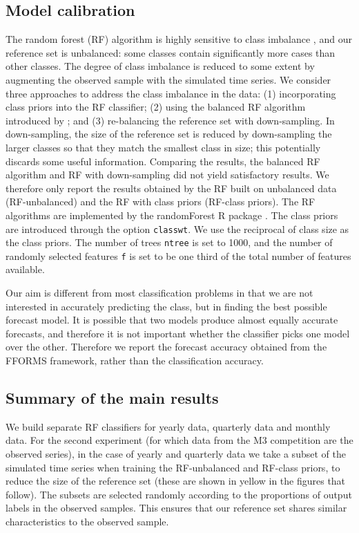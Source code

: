 \documentclass[11pt,a4paper,]{article}
\theoremstyle{definition}
\theoremstyle{definition}
\theoremstyle{definition}
\theoremstyle{remark}
\begin{document}
\hypertarget{model-calibration}{%
\subsection{Model calibration}\label{model-calibration}}

The random forest (RF) algorithm is highly sensitive to class imbalance
\autocite{breiman2001random}, and our reference set is unbalanced: some
classes contain significantly more cases than other classes. The degree
of class imbalance is reduced to some extent by augmenting the observed
sample with the simulated time series. We consider three approaches to
address the class imbalance in the data: (1) incorporating class priors
into the RF classifier; (2) using the balanced RF algorithm introduced
by \textcite{chen2004using}; and (3) re-balancing the reference set with
down-sampling. In down-sampling, the size of the reference set is
reduced by down-sampling the larger classes so that they match the
smallest class in size; this potentially discards some useful
information. Comparing the results, the balanced RF algorithm and RF
with down-sampling did not yield satisfactory results. We therefore only
report the results obtained by the RF built on unbalanced data
(RF-unbalanced) and the RF with class priors (RF-class priors). The RF
algorithms are implemented by the randomForest R package
\autocites{liaw2002randomforest}{rfpkg}. The class priors are introduced
through the option \texttt{classwt}. We use the reciprocal of class size
as the class priors. The number of trees \texttt{ntree} is set to 1000,
and the number of randomly selected features \texttt{f} is set to be one
third of the total number of features available.

Our aim is different from most classification problems in that we are
not interested in accurately predicting the class, but in finding the
best possible forecast model. It is possible that two models produce
almost equally accurate forecasts, and therefore it is not important
whether the classifier picks one model over the other. Therefore we
report the forecast accuracy obtained from the FFORMS framework, rather
than the classification accuracy.

\hypertarget{sec:results}{%
\subsection{Summary of the main results}\label{sec:results}}

We build separate RF classifiers for yearly data, quarterly data and
monthly data. For the second experiment (for which data from the M3
competition are the observed series), in the case of yearly and
quarterly data we take a subset of the simulated time series when
training the RF-unbalanced and RF-class priors, to reduce the size of
the reference set (these are shown in yellow in the figures that
follow). The subsets are selected randomly according to the proportions
of output labels in the observed samples. This ensures that our
reference set shares similar characteristics to the observed sample.
\end{document}
